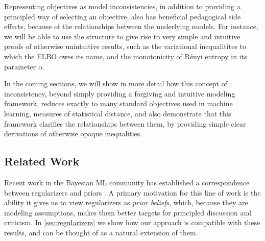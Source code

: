 \documentclass[twoside]{article}
\theoremstyle{plain}
\theoremstyle{definition}
\begin{document}

Representing objectives as model inconsistencies, in addition to providing a principled way of selecting an objective, also has beneficial pedagogical side effects, because of the relationships between the underlying models.
For instance, we will be able to use the structure to give rise to very simple and intuitive proofs of otherwise unintuitive results, such as the variational inequalitites to which the ELBO owes its name, and the monotonicity of R\'enyi entropy  in its parameter $\alpha$.




In the coming sections, we will show in more detail how this concept of inconsistency, beyond simply providing a forgiving and intuitive modeling framework, reduces exactly to many standard objectives used in machine learning, measures of statistical distance, and also demonstrate that this framework clarifies the relationships between them, by providing simple clear derivations of otherwise opaque inequalities.


\subsection{Related Work}

Recent work in the Bayesian ML community has established a correspondence between regularizers and priors
\cite{williams1995bayesian,rennie2003l2,probinterptowardsds,probinterpblogpost}.
A primary motivation for this line of work is the ability it gives us to view regularizers as \emph{prior beliefs}, which, because they are modeling assumptions, makes them better targets for principled discussion and criticism.
In \cref{sec:regularizers} we show how our approach is compatible with these results, and can be thought of as a natural extension of them.
\end{document}
